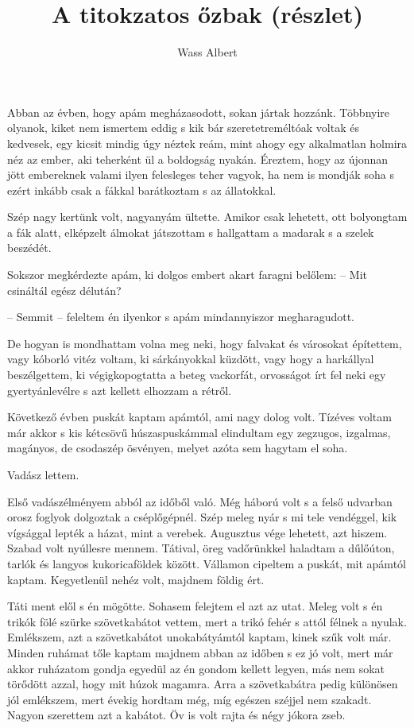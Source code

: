 \documentclass{IEEEtran}
\author{ Wass Albert}
\title{ A titokzatos őzbak (részlet)}
\begin{document}
\maketitle

Abban az évben, hogy apám megházasodott, sokan jártak hozzánk. Többnyire olyanok, kiket nem ismertem eddig s kik bár szeretetreméltóak voltak és kedvesek, egy kicsit mindig úgy néztek reám, mint ahogy egy alkalmatlan holmira néz az ember, aki teherként ül a boldogság nyakán. Éreztem, hogy az újonnan jött embereknek valami ilyen felesleges teher vagyok, ha nem is mondják soha s ezért inkább csak a fákkal barátkoztam s az állatokkal.

Szép nagy kertünk volt, nagyanyám ültette. Amikor csak lehetett, ott bolyongtam a fák alatt, elképzelt álmokat játszottam s hallgattam a madarak s a szelek beszédét.

Sokszor megkérdezte apám, ki dolgos embert akart faragni belőlem: – Mit csináltál egész délután?

– Semmit – feleltem én ilyenkor s apám mindannyiszor megharagudott.

De hogyan is mondhattam volna meg neki, hogy falvakat és városokat építettem, vagy kóborló vitéz voltam, ki sárkányokkal küzdött, vagy hogy a harkállyal beszélgettem, ki végigkopogtatta a beteg vackorfát, orvosságot írt fel neki egy gyertyánlevélre s azt kellett elhozzam a rétről.

Következő évben puskát kaptam apámtól, ami nagy dolog volt. Tízéves voltam már akkor s kis kétcsövű húszaspuskámmal elindultam egy zegzugos, izgalmas, magányos, de csodaszép ösvényen, melyet azóta sem hagytam el soha.

Vadász lettem.

Első vadászélményem abból az időből való. Még háború volt s a felső udvarban orosz foglyok dolgoztak a cséplőgépnél. Szép meleg nyár s mi tele vendéggel, kik vígsággal lepték a házat, mint a verebek. Augusztus vége lehetett, azt hiszem. Szabad volt nyúllesre mennem. Tátival, öreg vadőrünkkel haladtam a dűlőúton, tarlók és langyos kukoricaföldek között. Vállamon cipeltem a puskát, mit apámtól kaptam. Kegyetlenül nehéz volt, majdnem földig ért.

Táti ment elől s én mögötte. Sohasem felejtem el azt az utat. Meleg volt s én trikók fölé szürke szövetkabátot vettem, mert a trikó fehér s attól félnek a nyulak. Emlékszem, azt a szövetkabátot unokabátyámtól kaptam, kinek szűk volt már. Minden ruhámat tőle kaptam majdnem abban az időben s ez jó volt, mert már akkor ruházatom gondja egyedül az én gondom kellett legyen, más nem sokat törődött azzal, hogy mit húzok magamra. Arra a szövetkabátra pedig különösen jól emlékszem, mert évekig hordtam még, míg egészen széjjel nem szakadt. Nagyon szerettem azt a kabátot. Öv is volt rajta és négy jókora zseb.
\end{document}
